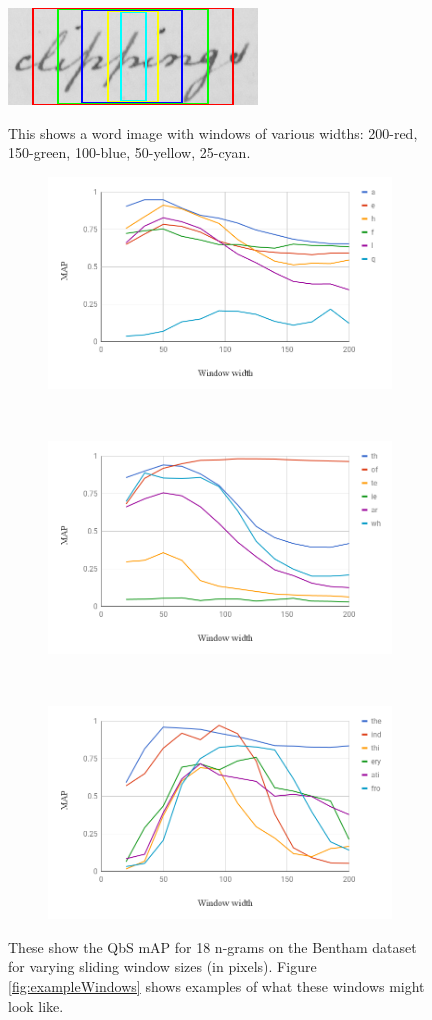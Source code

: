 \documentclass[ms,electronic,twosidetoc,letterpaper,chaptercenter,parttop,lof,lot]{byumsphd}
\begin{document}
\begin{figure}
    \centering
    \includegraphics[width=.33\textwidth]{exampleWindows}
    \caption{This shows a word image with windows of various widths: 200-red, 150-green, 100-blue, 50-yellow, 25-cyan.
    }
    \label{fig:exampleWindows}

    \centering
    \begin{subfigure}{.99\textwidth}
  \centering
  \includegraphics[width=.6\linewidth]{windowsizes1}
\end{subfigure}
\\
\begin{subfigure}{.99\textwidth}
  \centering
  \includegraphics[width=.6\linewidth]{windowsizes2}
\end{subfigure}
\\
\begin{subfigure}{.99\textwidth}
  \centering
  \includegraphics[width=.6\linewidth]{windowsizes3}
\end{subfigure}
    \caption{These show the QbS mAP for 18 n-grams on the Bentham dataset for varying sliding window sizes (in pixels). Figure \ref{fig:exampleWindows} shows examples of what these windows might look like.
    }
    \label{fig:windowsizes}
\end{figure}
\end{document}
